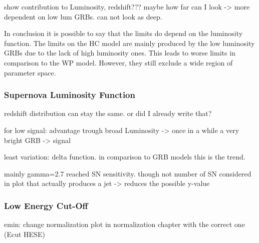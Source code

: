 show contribution to Luminosity, redshift??? maybe how far can I look -> more 
dependent on low lum GRBs. can not look as deep.

In conclusion it is possible to say that the limits do depend on the luminosity 
function. The limits on the HC model are mainly produced by the low 
luminosity GRBs due to the lack of high luminosity ones. This leads to 
worse limits in comparison to the WP model. However, they still exclude a wide 
region of parameter space.


\subsubsection{Supernova Luminosity Function}
\label{sec:results_SN}
redshift distribution can stay the same. or did I already write that?

for low signal: advantage trough broad Luminosity -> once in a while a very 
bright GRB -> signal

least variation: delta function. in comparison to GRB models this is the trend.

mainly gamma=2.7 reached SN sensitivity. though not number of SN considered in 
plot that actually produces a jet -> reduces the possible y-value

\subsubsection{Low Energy Cut-Off}
\label{sec:results_Emin}
emin: change normalization plot in normalization chapter with the correct one 
(Ecut HESE)


